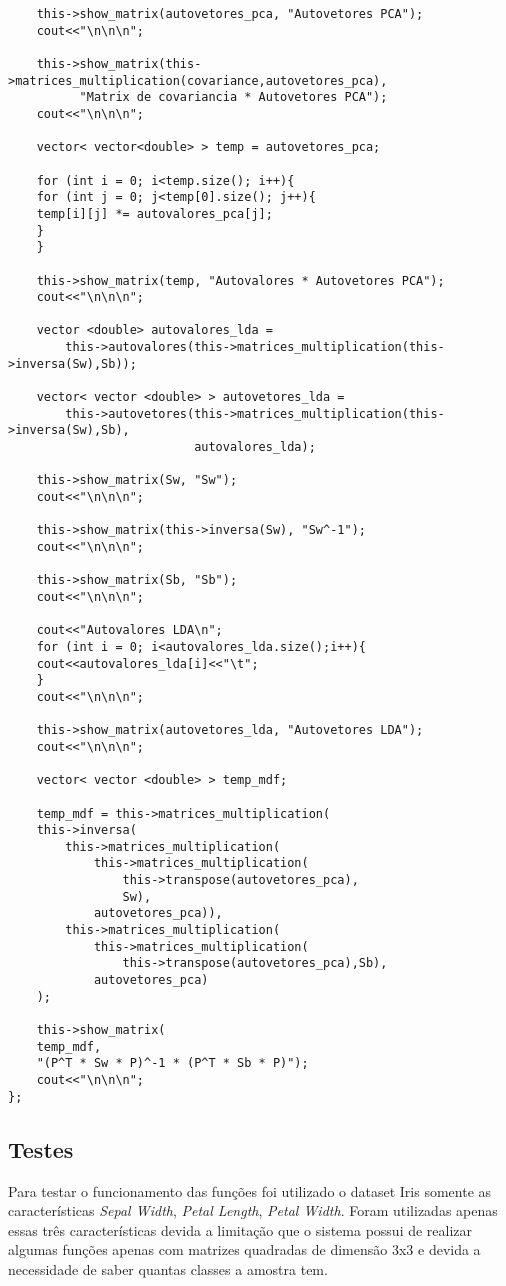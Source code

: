 \documentclass[a4paper, 11pt]{article}
\begin{document}
\begin{lstlisting}
    this->show_matrix(autovetores_pca, "Autovetores PCA");
    cout<<"\n\n\n";

    this->show_matrix(this->matrices_multiplication(covariance,autovetores_pca), 
    	  "Matrix de covariancia * Autovetores PCA");
    cout<<"\n\n\n";

    vector< vector<double> > temp = autovetores_pca;

    for (int i = 0; i<temp.size(); i++){
    for (int j = 0; j<temp[0].size(); j++){
    temp[i][j] *= autovalores_pca[j];
    }
    }

    this->show_matrix(temp, "Autovalores * Autovetores PCA");
    cout<<"\n\n\n";

    vector <double> autovalores_lda = 
    	this->autovalores(this->matrices_multiplication(this->inversa(Sw),Sb));
    
    vector< vector <double> > autovetores_lda = 
    	this->autovetores(this->matrices_multiplication(this->inversa(Sw),Sb), 
        				  autovalores_lda);

    this->show_matrix(Sw, "Sw");
    cout<<"\n\n\n";

    this->show_matrix(this->inversa(Sw), "Sw^-1");
    cout<<"\n\n\n";

    this->show_matrix(Sb, "Sb");
    cout<<"\n\n\n";

    cout<<"Autovalores LDA\n";
    for (int i = 0; i<autovalores_lda.size();i++){
    cout<<autovalores_lda[i]<<"\t";
    }
    cout<<"\n\n\n";

    this->show_matrix(autovetores_lda, "Autovetores LDA");
    cout<<"\n\n\n";

    vector< vector <double> > temp_mdf;

    temp_mdf = this->matrices_multiplication(
    this->inversa( 
    	this->matrices_multiplication(
        	this->matrices_multiplication(
            	this->transpose(autovetores_pca),
                Sw),
            autovetores_pca)),
    	this->matrices_multiplication(
        	this->matrices_multiplication(
            	this->transpose(autovetores_pca),Sb),
            autovetores_pca)
    );

    this->show_matrix(
    temp_mdf, 
    "(P^T * Sw * P)^-1 * (P^T * Sb * P)");
    cout<<"\n\n\n";
};
\end{lstlisting}


\subsection*{Testes}
Para testar o funcionamento das funções foi utilizado o dataset Iris somente as características \textit{Sepal Width}, \textit{Petal Length}, \textit{Petal Width}. Foram utilizadas apenas essas três características devida a limitação que o sistema possui de realizar algumas funções apenas com matrizes quadradas de dimensão 3x3 e devida a necessidade de saber quantas classes a amostra tem.
\end{document}
